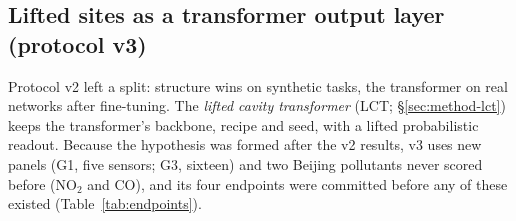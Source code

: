 \subsection{Lifted sites as a transformer output layer (protocol v3)}
\label{sec:exp-v3}

Protocol v2 left a split: structure wins on synthetic tasks, the transformer on real networks after fine-tuning. The
\emph{lifted cavity transformer} (LCT; \S\ref{sec:method-lct}) keeps the transformer's backbone, recipe and seed, with
a lifted probabilistic readout. Because the hypothesis was formed after the v2 results, v3 uses new panels (G1,
five sensors; G3, sixteen) and two Beijing pollutants never scored before (NO$_2$ and CO), and its four endpoints were
committed before any of these existed (Table~\ref{tab:endpoints}).




